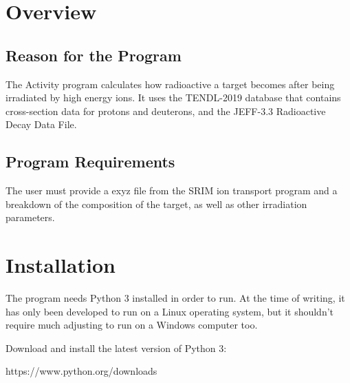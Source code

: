 \documentclass[12pt,twoside]{manual}
\begin{document}
\chapter{Overview}

\section{Reason for the Program}

The Activity program calculates how radioactive a target becomes after being irradiated by high energy ions.  It uses the TENDL-2019 database that contains cross-section data for protons and deuterons, and the JEFF-3.3 Radioactive Decay Data File.

\section{Program Requirements}

The user must provide a exyz file from the SRIM ion transport program and a breakdown of the composition of the target, as well as other irradiation parameters.




\chapter{Installation}

The program needs Python 3 installed in order to run.  At the time of writing, it has only been developed to run on a Linux operating system, but it shouldn't require much adjusting to run on a Windows computer too.

Download and install the latest version of Python 3:

https://www.python.org/downloads
\end{document}
